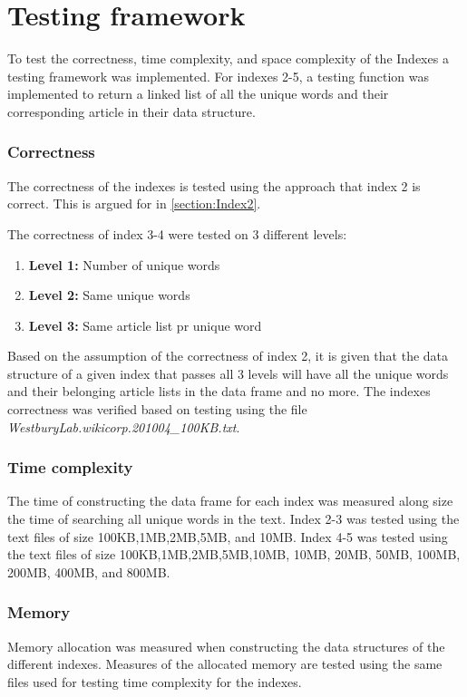 \section{Testing framework}
To test the correctness, time complexity, and space complexity of the Indexes a testing framework was implemented. For indexes 2-5, a testing function was implemented to return a linked list of all the unique words and their corresponding article in their data structure.

\subsubsection{Correctness}
The correctness of the indexes is tested using the approach that index 2 is correct. This is argued for in \ref{section:Index2}.

The correctness of index 3-4 were tested on 3 different levels:

\begin{enumerate}
    \item[] \textbf{Level 1:} Number of unique words 
    \item[] \textbf{Level 2:} Same unique words
    \item[] \textbf{Level 3:} Same article list pr unique word
\end{enumerate}

Based on the assumption of the correctness of index 2, it is given that the data structure of a given index that passes all 3 levels will have all the unique words and their belonging article lists in the data frame and no more. The indexes correctness was verified based on testing using the file \textit{WestburyLab.wikicorp.201004\_100KB.txt}.

\subsubsection{Time complexity}
The time of constructing the data frame for each index was measured along size the time of searching all unique words in the text. Index 2-3 was tested using the text files of size 100KB,1MB,2MB,5MB, and 10MB. Index 4-5 was tested using the text files of size 100KB,1MB,2MB,5MB,10MB, 10MB, 20MB, 50MB, 100MB, 200MB, 400MB, and 800MB.

\subsubsection{Memory}
Memory allocation was measured when constructing the data structures of the different indexes. Measures of the allocated memory are tested using the same files used for testing time complexity for the indexes.  






